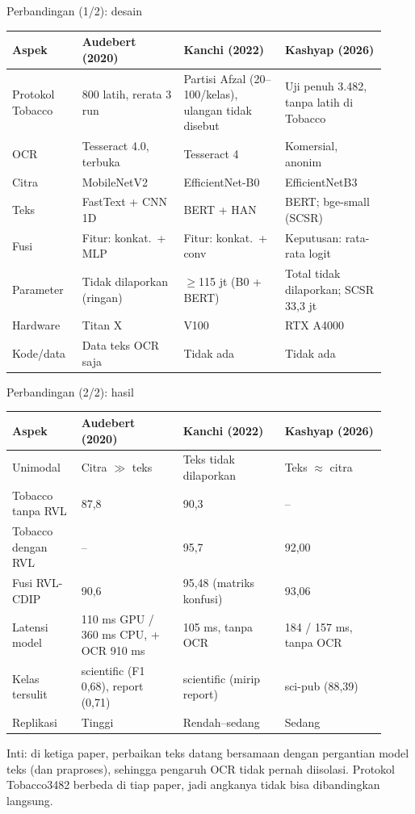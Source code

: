 \documentclass[aspectratio=169,10pt]{beamer}
\newcommand\kecil{\fontsize{8}{9.5}\selectfont}
\begin{document}
\begin{frame}{Perbandingan (1/2): desain}
  \kecil
  \setlength\tabcolsep{3pt}
  \begin{tabular}{L{0.17\linewidth}L{0.25\linewidth}L{0.25\linewidth}L{0.25\linewidth}}
    \toprule
    Aspek & Audebert (2020) & Kanchi (2022) & Kashyap (2026) \\ \midrule
    Protokol Tobacco & 800 latih, rerata 3 run & Partisi Afzal (20--100/kelas), ulangan tidak disebut & Uji penuh 3.482, tanpa latih di Tobacco \\
    OCR & Tesseract 4.0, terbuka & Tesseract 4 & Komersial, anonim \\
    Citra & MobileNetV2 & EfficientNet-B0 & EfficientNetB3 \\
    Teks & FastText + CNN 1D & BERT + HAN & BERT; bge-small (SCSR) \\
    Fusi & Fitur: konkat.\ + MLP & Fitur: konkat.\ + conv & Keputusan: rata-rata logit \\
    Parameter & Tidak dilaporkan (ringan) & $\geq$115 jt (B0 + BERT) & Total tidak dilaporkan; SCSR 33,3 jt \\
    Hardware & Titan X & V100 & RTX A4000 \\
    Kode/data & Data teks OCR saja & Tidak ada & Tidak ada \\ \bottomrule
  \end{tabular}
\end{frame}

\begin{frame}{Perbandingan (2/2): hasil}
  \kecil
  \setlength\tabcolsep{3pt}
  \begin{tabular}{L{0.17\linewidth}L{0.25\linewidth}L{0.25\linewidth}L{0.25\linewidth}}
    \toprule
    Aspek & Audebert (2020) & Kanchi (2022) & Kashyap (2026) \\ \midrule
    Unimodal & Citra $\gg$ teks & Teks tidak dilaporkan & Teks $\approx$ citra \\
    Tobacco tanpa RVL & 87,8 & 90,3 & -- \\
    Tobacco dengan RVL & -- & 95,7 & 92,00 \\
    Fusi RVL-CDIP & 90,6 & 95,48 (matriks konfusi) & 93,06 \\
    Latensi model & 110 ms GPU / 360 ms CPU, \alert{+ OCR 910 ms} & 105 ms, tanpa OCR & 184 / 157 ms, tanpa OCR \\
    Kelas tersulit & scientific (F1 0,68), report (0,71) & scientific (mirip report) & sci-pub (88,39) \\
    Replikasi & Tinggi & Rendah--sedang & Sedang \\ \bottomrule
  \end{tabular}

  \vspace{6pt}
  \alert{Inti:} di ketiga paper, perbaikan teks datang bersamaan dengan pergantian model teks
  (dan praproses), sehingga pengaruh OCR tidak pernah diisolasi. Protokol Tobacco3482 berbeda
  di tiap paper, jadi angkanya tidak bisa dibandingkan langsung.
\end{frame}
\end{document}
